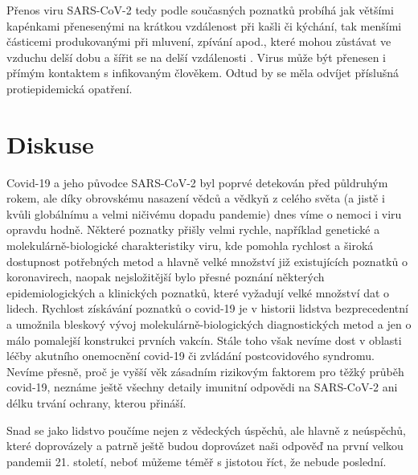Přenos viru SARS-CoV-2 tedy podle současných poznatků probíhá jak většími kapénkami přenesenými na krátkou vzdálenost při kašli či kýchání, tak menšími částicemi produkovanými při mluvení, zpívání apod., které mohou zůstávat ve vzduchu delší dobu a šířit se na delší vzdálenosti \cite{Leung:2021}. Virus může být přenesen i přímým kontaktem s infikovaným člověkem. Odtud by se měla odvíjet příslušná protiepidemická opatření.



\section*{Diskuse}
Covid-19 a jeho původce SARS-CoV-2 byl poprvé detekován před půldruhým rokem, ale díky obrovskému nasazení vědců a vědkyň z celého světa (a jistě i kvůli globálnímu a velmi ničivému dopadu pandemie) dnes víme o nemoci i viru opravdu hodně. Některé poznatky přišly velmi rychle, například genetické a molekulárně-biologické charakteristiky viru, kde pomohla rychlost a široká dostupnost potřebných metod a hlavně velké množství již existujících poznatků o koronavirech, naopak nejsložitější bylo přesné poznání některých epidemiologických a klinických poznatků, které vyžadují velké množství dat o lidech. Rychlost získávání poznatků o covid-19 je v historii lidstva bezprecedentní a umožnila bleskový vývoj molekulárně-biologických diagnostických metod a jen o málo pomalejší konstrukci prvních vakcín. Stále toho však nevíme dost v oblasti léčby akutního onemocnění covid-19 či zvládání postcovidového syndromu. Nevíme přesně, proč je vyšší věk zásadním rizikovým faktorem pro těžký průběh covid-19, neznáme ještě všechny detaily imunitní odpovědi na SARS-CoV-2 ani délku trvání ochrany, kterou přináší.

Snad se jako lidstvo poučíme nejen z vědeckých úspěchů, ale hlavně z neúspěchů, které doprovázely a patrně ještě budou doprovázet naši odpověď na první velkou pandemii 21. století, neboť můžeme téměř s jistotou říct, že nebude poslední.

